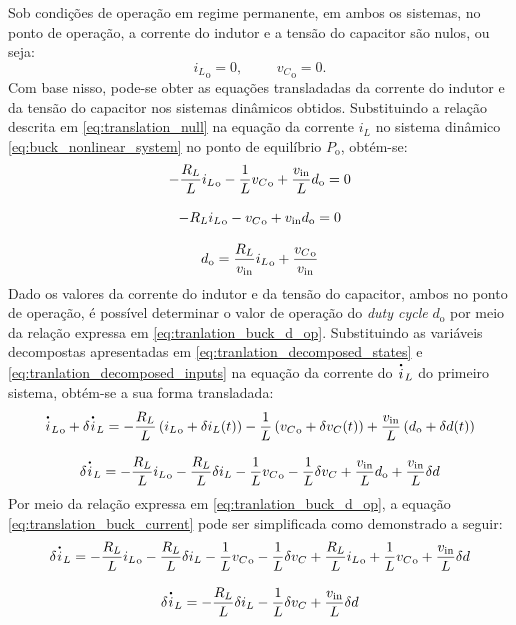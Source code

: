Sob condições de operação em regime permanente, em ambos os sistemas, no ponto de operação, a corrente do indutor e a tensão do capacitor são nulos, ou seja: \begin{equation} {i_L}_{\mathrm{o}} = 0, \hspace{1cm} {v_C}_{\mathrm{o}} = 0. \label{eq:translation_null}\end{equation} Com base nisso, pode-se obter as equações transladadas da corrente do indutor e da tensão do capacitor nos sistemas dinâmicos obtidos. Substituindo a relação descrita em \eqref{eq:translation_null} na equação da corrente $i_L$ no sistema dinâmico \eqref{eq:buck_nonlinear_system} no ponto de equilíbrio $P_{\mathrm{o}}$, obtém-se: \begin{gather}
  - \frac{R_L}{L} {i_L}_{\mathrm{o}} - \frac{1}{L} {v_C}_{\mathrm{o}} + \frac{v_{\mathrm{in}}}{L}  d_{\mathrm{o}} = 0  \notag \\[8pt]
  - R_L {i_L}_{\mathrm{o}} - {v_C}_{\mathrm{o}} + v_{\mathrm{in}}  d_{\mathrm{o}} = 0 \notag \\[8pt]
  d_{\mathrm{o}} = \frac{R_L}{v_{\mathrm{in}}} {i_L}_{\mathrm{o}} + \frac{{v_C}_{\mathrm{o}}}{v_{\mathrm{in}}} \label{eq:tranlation_buck_d_op}
\end{gather} Dado os valores da corrente do indutor e da tensão do capacitor, ambos no ponto de operação, é possível determinar o valor de operação do \textit{duty cycle }$d_{\mathrm{o}}$ por meio da relação expressa em \eqref{eq:tranlation_buck_d_op}. Substituindo as variáveis decompostas apresentadas em \eqref{eq:tranlation_decomposed_states} e \eqref{eq:tranlation_decomposed_inputs} na equação da corrente do $\dt{i}_L$ do primeiro sistema, obtém-se a sua forma transladada: \begin{gather}
  {\dt{i}_L}_{\mathrm{o}} + \delta \dt{i}_L = - \frac{R_L}{L} \left({i_L}_{\mathrm{o}} + \delta i_L(t)\right) - \frac{1}{L} \left({v_C}_{\mathrm{o}} + \delta v_C(t)\right) + \frac{v_{\mathrm{in}}}{L} \left(d_{\mathrm{o}} + \delta d(t)\right) \notag\\[8pt]
  \delta \dt{i}_L = - \frac{R_L}{L} {i_L}_{\mathrm{o}} - \frac{R_L}{L} \delta i_L - \frac{1}{L} {v_C}_{\mathrm{o}} - \frac{1}{L} \delta v_C + \frac{v_{\mathrm{in}}}{L} d_{\mathrm{o}} + \frac{v_{\mathrm{in}}}{L} \delta d \label{eq:translation_buck_current}
\end{gather} Por meio da relação expressa em \eqref{eq:tranlation_buck_d_op}, a equação \eqref{eq:translation_buck_current} pode ser simplificada como demonstrado a seguir: \begin{gather}
  \delta \dt{i}_L = - \frac{R_L}{L} {i_L}_{\mathrm{o}} - \frac{R_L}{L} \delta i_L - \frac{1}{L} {v_C}_{\mathrm{o}} - \frac{1}{L} \delta v_C +  \frac{R_L}{L} {i_L}_{\mathrm{o}} + \frac{1}{L} {v_C}_{\mathrm{o}} + \frac{v_{\mathrm{in}}}{L} \delta d \notag \\[8pt]
  \delta \dt{i}_L = - \frac{R_L}{L} \delta i_L - \frac{1}{L} \delta v_C  + \frac{v_{\mathrm{in}}}{L} \delta d \label{eq:translation_buck_current_simplified}
\end{gather}

